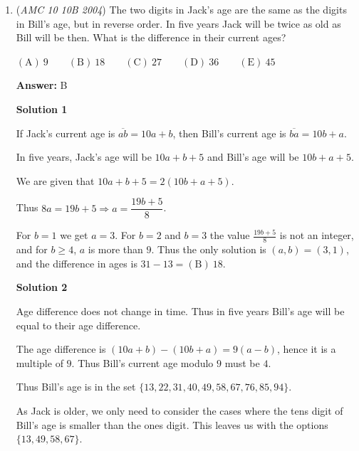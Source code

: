 \begin{enumerate}
\textbf{Solution 2}

Using \href{https://artofproblemsolving.com/wiki/index.php?title=Descartes\%27\_Circle\_Formula}{Descartes' Circle Formula}, we can assign curvatures to all the circles: $1$, $1$, $1$, and $-\frac{1}{r}$ (b/c the bigger circle is externally tangent to all the other circles, the radius of the bigger circle is negative). Then, we can solve:

 $2(1^2+1^2+1^2+(-\frac{1}{r})^2) = (1+1+1-\frac{1}{r})^2$
$r = \boxed{\mathrm{(D)\ }\frac{3+2\sqrt{3}}3}$



	\item (\textit{AMC 10 10B 2004}) The two digits in Jack's age are the same as the digits in Bill's age, but in reverse order. In five years Jack will be twice as old as Bill will be then. What is the difference in their current ages?


 $\mathrm{(A) \ } 9 \qquad \mathrm{(B) \ } 18 \qquad \mathrm{(C) \ } 27 \qquad \mathrm{(D) \ } 36\qquad \mathrm{(E) \ } 45$

 \textbf{Answer: }B



\textbf{Solution 1}

If Jack's current age is $\overline{ab}=10a+b$, then Bill's current age is $\overline{ba}=10b+a$.

 In five years, Jack's age will be $10a+b+5$ and Bill's age will be $10b+a+5$. 

 We are given that $10a+b+5=2(10b+a+5)$. 

 
Thus $8a=19b+5 \Rightarrow a=\dfrac{19b+5}{8}$. 

 For $b=1$ we get $a=3$. For $b=2$ and $b=3$ the value $\frac{19b+5}8$ is not an integer, and for $b\geq 4$, $a$ is more than $9$. Thus the only solution is $(a,b)=(3,1)$, and the difference in ages is $31-13=\boxed{\mathrm{(B)\ }18}$.

 



\textbf{Solution 2}

Age difference does not change in time. Thus in five years Bill's age will be equal to their age difference.

 The age difference is $(10a+b)-(10b+a)=9(a-b)$, hence it is a multiple of $9$. Thus Bill's current age modulo $9$ must be $4$.

 Thus Bill's age is in the set $\{13,22,31,40,49,58,67,76,85,94\}$.

 As Jack is older, we only need to consider the cases where the tens digit of Bill's age is smaller than the ones digit. This leaves us with the options $\{13,49,58,67\}$. 


\end{enumerate}
